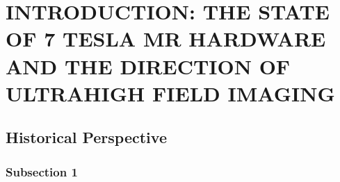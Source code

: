
\chapter{INTRODUCTION: THE STATE OF 7 TESLA MR HARDWARE AND THE DIRECTION OF ULTRAHIGH FIELD IMAGING}\label{chapters:Introduction}
\vspace{-7mm}

\section{Historical Perspective}\label{sec:ch_1_sec_1}


\subsection{Subsection 1}\label{subsec:subsec_1.1.1}


\clearpage
